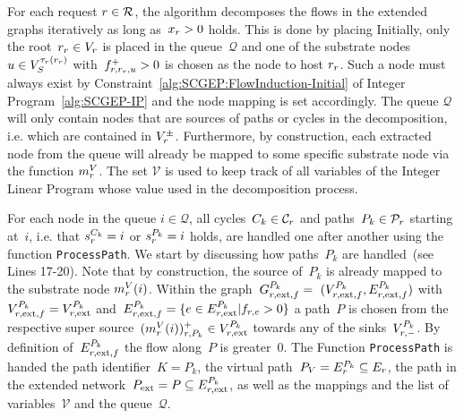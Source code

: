 \documentclass[10pt, conference, letterpaper]{IEEEtran}
\begin{document}
For each request $r \in \mathcal{R}$, the algorithm decomposes the flows in the extended graphs iteratively as long as~$x_r > 0$ holds. This is done by placing Initially, only the root~$\VVroot \in \VV$ is placed in the queue~$\mathcal{Q}$ and one of the substrate nodes~$u \in \SVTypes[\Vtype(\VVroot)]$ with~$f^+_{r, \VVroot, u} >0$ is chosen as the node to host $\VVroot$. Such a node must always exist by Constraint~\ref{alg:SCGEP:FlowInduction-Initial} of Integer Program~\ref{alg:SCGEP-IP} and the node mapping is set accordingly. The queue $\mathcal{Q}$ will only contain nodes that are sources of paths or cycles in the decomposition, i.e. which are contained in $\VVSourcesTargets$. Furthermore, by construction, each extracted node from the queue will already be mapped to some specific substrate node via the function $m^V_{r}$. The set $\mathcal{V}$ is used to keep track of all variables of the Integer Linear Program whose value used in the decomposition process.

For each node in the queue $i \in \mathcal{Q}$, all cycles~$C_k \in \Cycles$ and paths~$P_k \in \Paths$ starting at~$i$, i.e. that $\VVcycleSource = i$ or $\VVpathSource = i$ holds,  are handled one after another using the function \texttt{ProcessPath}. We start by discussing how paths~$P_k$ are handled~(see Lines 17-20). Note that by construction, the source of~$P_k$ is already mapped to the substrate node $m^V_{r}(i)$. Within the graph~$\VGextpathFlow =~(\VVextpathFlow, \VEextpathFlow)$ with~$\VVextpathFlow=\VVextpath$ and~$\VEextpathFlow = \{e \in \VEextpath | f_{\req, e} > 0 \}$ a path~$P$ is chosen from the respective super source~$(\mapV(i))^+_{r,P_k} \in \VVextpath$ towards any of the sinks~$\VVextpathTargets$. By definition of~$\VEextpathFlow$ the flow along~$P$ is greater~$0$. The Function \texttt{ProcessPath} is handed the path identifier~$K = P_k$, the virtual path~$P_V = \VEpath \subseteq \VE$, the path in the extended network~$P_{\textnormal{ext}} = P \subseteq \VEextpath$, as well as the mappings and the list of variables~$\mathcal{V}$ and the queue~$\mathcal{Q}$. 
\end{document}
